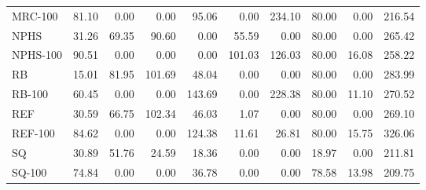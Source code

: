 \begin{table}
\begin{tabular}{lrrrrrrrrr}
MRC-100  &       81.10 &      0.00 &      0.00 &      95.06 &             0.00 &          234.10 &       80.00 &        0.00 &        216.54 \\
NPHS     &       31.26 &     69.35 &     90.60 &       0.00 &            55.59 &            0.00 &       80.00 &        0.00 &        265.42 \\
NPHS-100 &       90.51 &      0.00 &      0.00 &       0.00 &           101.03 &          126.03 &       80.00 &       16.08 &        258.22 \\
RB       &       15.01 &     81.95 &    101.69 &      48.04 &             0.00 &            0.00 &       80.00 &        0.00 &        283.99 \\
RB-100   &       60.45 &      0.00 &      0.00 &     143.69 &             0.00 &          228.38 &       80.00 &       11.10 &        270.52 \\
REF      &       30.59 &     66.75 &    102.34 &      46.03 &             1.07 &            0.00 &       80.00 &        0.00 &        269.10 \\
REF-100  &       84.62 &      0.00 &      0.00 &     124.38 &            11.61 &           26.81 &       80.00 &       15.75 &        326.06 \\
SQ       &       30.89 &     51.76 &     24.59 &      18.36 &             0.00 &            0.00 &       18.97 &        0.00 &        211.81 \\
SQ-100   &       74.84 &      0.00 &      0.00 &      36.78 &             0.00 &            0.00 &       78.58 &       13.98 &        209.75 \\
\bottomrule
\end{tabular}
\end{table}
